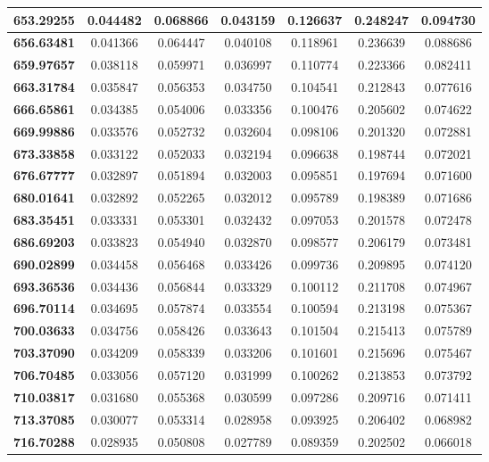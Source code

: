 \documentclass[11pt]{article}
\begin{document}
\begin{appendices}
\begin{longtable}{|c|c|c|c|c|c|c|}
	\textbf{653.29255} & 0.044482 & 0.068866 & 0.043159 & 0.126637 & 0.248247 & 0.094730 \\ \hline
	\textbf{656.63481} & 0.041366 & 0.064447 & 0.040108 & 0.118961 & 0.236639 & 0.088686 \\ \hline
	\textbf{659.97657} & 0.038118 & 0.059971 & 0.036997 & 0.110774 & 0.223366 & 0.082411 \\ \hline
	\textbf{663.31784} & 0.035847 & 0.056353 & 0.034750 & 0.104541 & 0.212843 & 0.077616 \\ \hline
	\textbf{666.65861} & 0.034385 & 0.054006 & 0.033356 & 0.100476 & 0.205602 & 0.074622 \\ \hline
	\textbf{669.99886} & 0.033576 & 0.052732 & 0.032604 & 0.098106 & 0.201320 & 0.072881 \\ \hline
	\textbf{673.33858} & 0.033122 & 0.052033 & 0.032194 & 0.096638 & 0.198744 & 0.072021 \\ \hline
	\textbf{676.67777} & 0.032897 & 0.051894 & 0.032003 & 0.095851 & 0.197694 & 0.071600 \\ \hline
	\textbf{680.01641} & 0.032892 & 0.052265 & 0.032012 & 0.095789 & 0.198389 & 0.071686 \\ \hline
	\textbf{683.35451} & 0.033331 & 0.053301 & 0.032432 & 0.097053 & 0.201578 & 0.072478 \\ \hline
	\textbf{686.69203} & 0.033823 & 0.054940 & 0.032870 & 0.098577 & 0.206179 & 0.073481 \\ \hline
	\textbf{690.02899} & 0.034458 & 0.056468 & 0.033426 & 0.099736 & 0.209895 & 0.074120 \\ \hline
	\textbf{693.36536} & 0.034436 & 0.056844 & 0.033329 & 0.100112 & 0.211708 & 0.074967 \\ \hline
	\textbf{696.70114} & 0.034695 & 0.057874 & 0.033554 & 0.100594 & 0.213198 & 0.075367 \\ \hline
	\textbf{700.03633} & 0.034756 & 0.058426 & 0.033643 & 0.101504 & 0.215413 & 0.075789 \\ \hline
	\textbf{703.37090} & 0.034209 & 0.058339 & 0.033206 & 0.101601 & 0.215696 & 0.075467 \\ \hline
	\textbf{706.70485} & 0.033056 & 0.057120 & 0.031999 & 0.100262 & 0.213853 & 0.073792 \\ \hline
	\textbf{710.03817} & 0.031680 & 0.055368 & 0.030599 & 0.097286 & 0.209716 & 0.071411 \\ \hline
	\textbf{713.37085} & 0.030077 & 0.053314 & 0.028958 & 0.093925 & 0.206402 & 0.068982 \\ \hline
	\textbf{716.70288} & 0.028935 & 0.050808 & 0.027789 & 0.089359 & 0.202502 & 0.066018 \\ \hline

\end{longtable}
\end{appendices}
\end{document}
